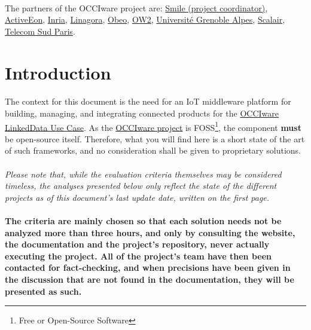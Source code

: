 \documentclass{article}
\begin{document}
\paragraph{} The partners of the OCCIware project are: \href{http://www.smile.fr/}{Smile (project coordinator)}, \href{https://www.activeeon.com/}{ActiveEon}, \href{https://www.inria.fr/en/}{Inria}, \href{https://linagora.com/}{Linagora}, \href{https://www.obeo.fr/en/}{Obeo}, \href{https://www.ow2.org/bin/view/Main/}{OW2}, \href{http://www.univ-grenoble-alpes.fr/}{Université Grenoble Alpes}, \href{https://www.scalair.fr/}{Scalair}, \href{http://www.telecom-sudparis.eu/}{Telecom Sud Paris}.

\newpage

\tableofcontents

\newpage

\section*{Introduction}
%

\paragraph{} The context for this document is the need for an IoT middleware platform for building, managing, and integrating connected products for the \href{https://github.com/occiware/occiware-ozwillo}{OCCIware LinkedData Use Case}. As the \href{http://www.occiware.org/bin/view/Main/}{OCCIware project} is FOSS\footnote{Free or Open-Source Software}, the component \textbf{must} be open-source itself. Therefore, what you will find here is a short state of the art of such frameworks, and no consideration shall be given to proprietary solutions.

\paragraph{} \emph{Please note that, while the evaluation criteria themselves may be considered timeless, the analyses presented below only reflect the state of the different projects as of this document's last update date, written on the first page.}

\paragraph{} \textbf{The criteria are mainly chosen so that each solution needs not be analyzed more than three hours, and only by consulting the website, the documentation and the project's repository, never actually executing the project. All of the project's team have then been contacted for fact-checking, and when precisions have been given in the discussion that are not found in the documentation, they will be presented as such.}
\end{document}
